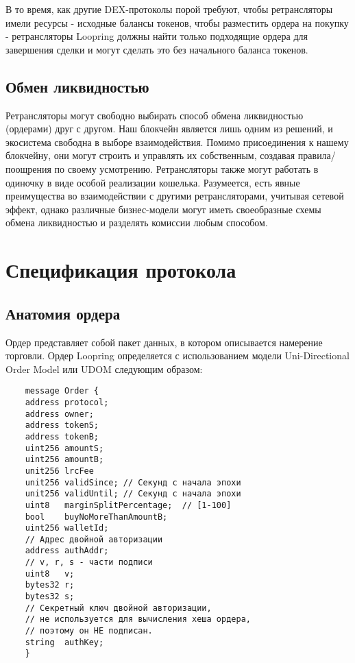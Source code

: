 \documentclass[utf8,nofonts]{article}
\begin{document}
\begin{multicols}{2}
	
	В то время, как другие DEX-протоколы порой требуют, чтобы ретрансляторы имели ресурсы - исходные балансы токенов, чтобы разместить ордера на покупку - ретрансляторы Loopring должны найти только подходящие ордера для завершения сделки и могут сделать это без начального баланса токенов.
	
	\subsection{Обмен ликвидностью\label{sec:liquidity_sharing}}
	Ретрансляторы могут свободно выбирать способ обмена ликвидностью (ордерами) друг с другом. Наш блокчейн является лишь одним из решений, и экосистема свободна в выборе взаимодействия. Помимо присоединения к нашему блокчейну, они могут строить и управлять их собственным, создавая правила/поощрения по своему усмотрению. Ретрансляторы также могут работать в одиночку в виде особой реализации кошелька. Разумеется, есть явные преимущества во взаимодействии с другими ретрансляторами, учитывая сетевой эффект, однако различные бизнес-модели могут иметь своеобразные схемы обмена ликвидностью и разделять комиссии любым способом.
	
	
	\section{Спецификация протокола\label{sec:protocol}}
	
	\subsection{Анатомия ордера\label{anatomy}}
	Ордер представляет собой пакет данных, в котором описывается намерение торговли. Ордер Loopring определяется с использованием модели Uni-Directional Order Model или UDOM следующим образом:
	
	\begin{verbatim}
	message Order {
	address protocol;
	address owner;
	address tokenS;
	address tokenB;
	uint256 amountS;
	uint256 amountB;
	unit256 lrcFee
	unit256 validSince; // Секунд с начала эпохи
	unit256 validUntil; // Секунд с начала эпохи
	uint8   marginSplitPercentage;  // [1-100]
	bool    buyNoMoreThanAmountB;
	uint256 walletId;
	// Адрес двойной авторизации
	address authAddr;
	// v, r, s - части подписи
	uint8   v;       
	bytes32 r;
	bytes32 s;
	// Секретный ключ двойной авторизации,
	// не используется для вычисления хеша ордера,
	// поэтому он НЕ подписан.
	string  authKey;          
	}
	\end{verbatim}
	

\end{multicols}
\end{document}

